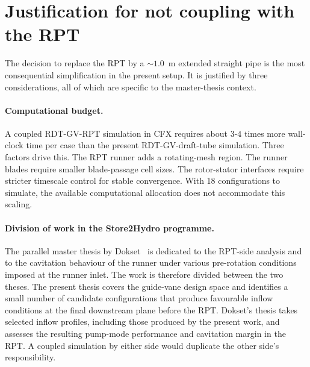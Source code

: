 \section{Justification for not coupling with the RPT}
\label{sec:rpt-decoupling-justification}
 
The decision to replace the RPT by a $\sim 1.0$~m extended straight pipe is the most consequential simplification in the present setup. It is justified by three considerations, all of which are specific to the master-thesis context.
 
\paragraph{Computational budget.} A coupled RDT-GV-RPT simulation in CFX requires about $3$-$4$ times more wall-clock time per case than the present RDT-GV-draft-tube simulation. Three factors drive this. The RPT runner adds a rotating-mesh region. The runner blades require smaller blade-passage cell sizes. The rotor-stator interfaces require stricter timescale control for stable convergence. With 18 configurations to simulate, the available computational allocation does not accommodate this scaling.
 
\paragraph{Division of work in the Store2Hydro programme.} The parallel master thesis by Dokset~\cite{Dokset2026} is dedicated to the RPT-side analysis and to the cavitation behaviour of the runner under various pre-rotation conditions imposed at the runner inlet. The work is therefore divided between the two theses. The present thesis covers the guide-vane design space and identifies a small number of candidate configurations that produce favourable inflow conditions at the final downstream plane before the RPT. Dokset's thesis takes selected inflow profiles, including those produced by the present work, and assesses the resulting pump-mode performance and cavitation margin in the RPT. A coupled simulation by either side would duplicate the other side's responsibility.
 

